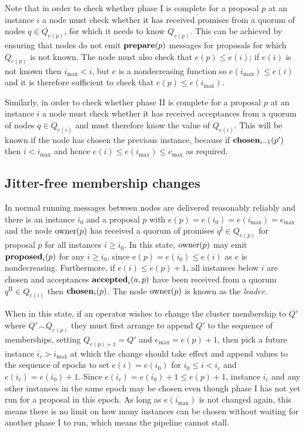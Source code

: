 \documentclass[journal]{IEEEtran}
\begin{document}
Note that in order to check whether phase I is complete for a proposal $p$ at
an instance $i$ a node must check whether it has received promises from a
quorum of nodes $q \in Q_{e(p)}$, for which it needs to know $Q_{e(p)}$. This
can be achieved by ensuring that nodes do not emit $\mathbf{prepare}(p)$ messages for
proposals for which $Q_{e(p)}$ is not known. The node must also check that
$e(p) \le e(i)$; if $e(i)$ is not known then $i_\mathrm{max} < i$, but $e$ is a
nondecreasing function so $e(i_\mathrm{max}) \le e(i)$ and it is therefore
sufficient to check that $e(p) \le e(i_\mathrm{max})$.

Similarly, in order to check whether phase II is complete for a proposal $p$ at
an instance $i$ a node must check whether it has received acceptances from a
quorum of nodes $q \in Q_{e(i)}$ and must therefore know the value of
$Q_{e(i)}$. This will be known if the node has chosen the previous instance,
because if $\mathbf{chosen}_{i-1}(p')$ then $i < i_\mathrm{max}$ and hence ${e(i) \le
e(i_\mathrm{max}) \le e_\mathrm{max}}$ as required.

\subsection{Jitter-free membership changes}

In normal running messages between nodes are delivered reasonably reliably and
there is an instance $i_0$ and a proposal $p$ with ${e(p) = e(i_0) =
e(i_\mathrm{max}) = e_\mathrm{max}}$ and the node $\mathrm{owner}(p)$ has received a
quorum of promises $q^\textrm{I} \in Q_{e(p)}$ for proposal $p$ for all
instances $i \ge i_0$. In this state, $\mathrm{owner}(p)$ may emit $\mathbf{proposed}_{i}(p)$ for
any $i \ge i_0$, since $e(p) = e(i_0) \le e(i)$ as $e$ is nondecreasing.
Furthermore, if $e(i) \le e(p) + 1$, all instances below $i$ are chosen and
acceptances $\mathbf{accepted}_{i}(a,p)$ have been received from a quorum $q^\textrm{II} \in
Q_{e(i)}$ then $\mathbf{chosen}_{i}(p)$. The node $\mathrm{owner}(p)$ is known as the
\textit{leader}.

When in this state, if an operator wishes to change the cluster membership to
$Q'$ where $Q' \frown Q_{e(p)}$ they must first arrange to append $Q'$ to the
sequence of memberships, setting $Q_{e(p)+1} = Q'$ and $e_\mathrm{max} = e(p) +
1$, then pick a future instance $i_c > i_\mathrm{max}$ at which the change
should take effect and append values to the sequence of epochs to set $e(i) =
e(i_0)$ for $i_0 \le i < i_c$ and $e(i_c) = e(i_0) + 1$.  Since $e(i_c) =
e(i_0) + 1 \le e(p) + 1$, instance $i_c$ and any other instances in the same
epoch may be chosen even though phase I has not yet run for a proposal in this
epoch. As long as $e(i_\mathrm{max})$ is not changed again, this means there is
no limit on how many instances can be chosen without waiting for another phase
I to run, which means the pipeline cannot stall.
\end{document}
